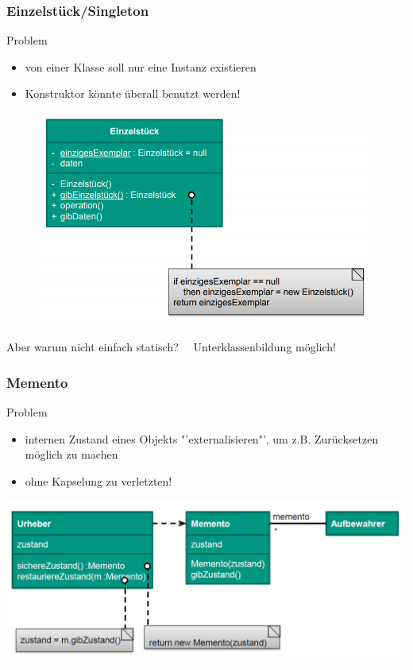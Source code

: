 \documentclass[18pt]{beamer}
\begin{document}
	\begin{frame}
		\frametitle{Einzelstück/Singleton}
		\begin{block}{Problem}
			\begin{itemize}
				\item von einer Klasse soll nur eine Instanz existieren
				\item Konstruktor könnte überall benutzt werden!
			\end{itemize}
		\end{block}
		\pause
		\centering
		\begin{figure}
			\includegraphics[scale=0.3]{./pics/tut4/singleton.png}
		\end{figure}
		\pause
		Aber warum nicht einfach statisch?\pause ~~ Unterklassenbildung möglich!
	\end{frame}

	\begin{frame}
		\frametitle{Memento}
		\begin{block}{Problem}
			\begin{itemize}
				\item internen Zustand eines Objekts "'externalisieren"', um z.B. Zurücksetzen möglich zu machen \pause 
				\item ohne Kapselung zu verletzten!
			\end{itemize}
		\end{block}
		\pause
		\centering
		\includegraphics[scale=0.4]{./pics/tut4/mem.png}
	\end{frame}
\end{document}
